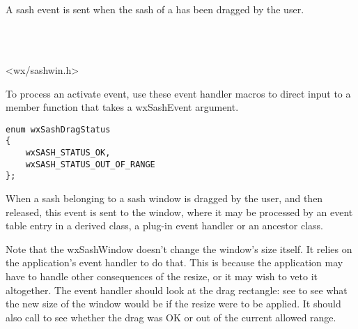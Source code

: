 \section{}\label{wxsashevent}

A sash event is sent when the sash of a  has been
dragged by the user.


\\
\\


<wx/sashwin.h>


To process an activate event, use these event handler macros to direct input to a member
function that takes a wxSashEvent argument.

\twocolwidtha{7cm}%
\begin{twocollist}\itemsep=0pt
\end{twocollist}


{\small
\begin{verbatim}
enum wxSashDragStatus
{
    wxSASH_STATUS_OK,
    wxSASH_STATUS_OUT_OF_RANGE
};
\end{verbatim}
}


When a sash belonging to a sash window is dragged by the user, and then released,
this event is sent to the window, where it may be processed by an event table
entry in a derived class, a plug-in event handler or an ancestor class.

Note that the wxSashWindow doesn't change the window's size itself. It relies on the application's
event handler to do that. This is because the application may have to handle other consequences
of the resize, or it may wish to veto it altogether. The event handler should
look at the drag rectangle: see  to see
what the new size of the window would be if the resize were to be applied. It should
also call  to see whether the
drag was OK or out of the current allowed range.

